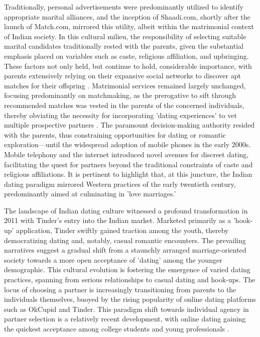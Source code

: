 Traditionally, personal advertisements were predominantly utilized to identify appropriate marital alliances, and the inception of Shaadi.com, shortly after the launch of Match.com, mirrored this utility, albeit within the matrimonial context of Indian society. In this cultural milieu, the responsibility of selecting suitable marital candidates traditionally rested with the parents, given the substantial emphasis placed on variables such as caste, religious affiliation, and upbringing. These factors not only held, but continue to hold, considerable importance, with parents extensively relying on their expansive social networks to discover apt matches for their offspring \cite{sharma_towards_2019, seth_online_2008}. Matrimonial services remained largely unchanged, focusing predominantly on matchmaking, as the prerogative to sift through recommended matches was vested in the parents of the concerned individuals, thereby obviating the necessity for incorporating 'dating experiences' to vet multiple prospective partners \cite{titzmann_changing_2013}. The paramount decision-making authority resided with the parents, thus constraining opportunities for dating or romantic exploration—until the widespread adoption of mobile phones in the early 2000s. Mobile telephony and the internet introduced novel avenues for discreet dating, facilitating the quest for partners beyond the traditional constraints of caste and religious affiliations. It is pertinent to highlight that, at this juncture, the Indian dating paradigm mirrored Western practices of the early twentieth century, predominantly aimed at culminating in 'love marriages.'

The landscape of Indian dating culture witnessed a profound transformation in 2011 with Tinder's entry into the Indian market. Marketed primarily as a 'hook-up' application, Tinder swiftly gained traction among the youth, thereby democratizing dating and, notably, casual romantic encounters. The prevailing narratives suggest a gradual shift from a staunchly arranged marriage-oriented society towards a more open acceptance of 'dating' among the younger demographic. This cultural evolution is fostering the emergence of varied dating practices, spanning from serious relationships to casual dating and hook-ups. The locus of choosing a partner is increasingly transitioning from parents to the individuals themselves, buoyed by the rising popularity of online dating platforms such as OkCupid and Tinder. This paradigm shift towards individual agency in partner selection is a relatively recent development, with online dating gaining the quickest acceptance among college students and young professionals \cite{doshi_date_2016}.
